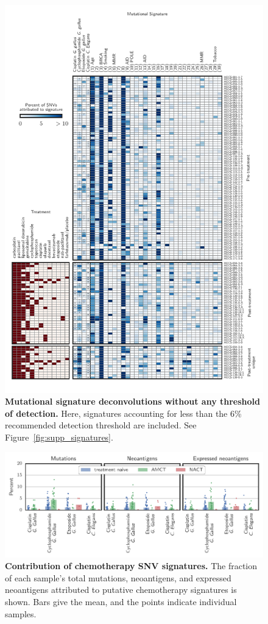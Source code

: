 \begin{figure}
\centering
\includegraphics[scale=1.0]{figures/supplementary_signatures_no_cutoff.pdf}
\caption{\textbf{Mutational signature deconvolutions without any threshold of detection.} Here, signatures accounting for less than the 6\% recommended detection threshold are included. See Figure~\ref{fig:supp_signatures}.}
\label{fig:supplementary_signatures_no_cutoff.pdf}
\end{figure}

\begin{figure}[htbp]
\centering
\includegraphics[scale=1.0]{figures/sources_of_mutations_and_neoantigens_ungrouped.pdf}
\caption{\textbf{Contribution of chemotherapy SNV signatures.} The fraction of each sample's total mutations, neoantigens, and expressed neoantigens attributed to putative chemotherapy signatures is shown. Bars give the mean, and the points indicate individual samples.}
\label{fig:sourcesungrouped}
\end{figure}

\FloatBarrier
